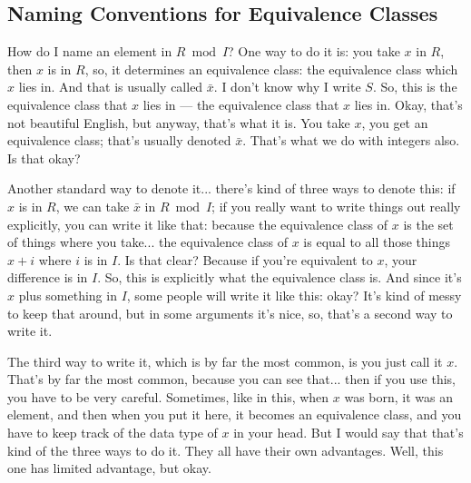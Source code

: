 \subsection{Naming Conventions for Equivalence Classes}

\begin{speech}[00:35:13 - 00:37:33]
How do I name an element in $R \bmod I$? One way to do it is: you take $x$ in $R$,  then $x$ is in $R$, so, it determines an equivalence class: the equivalence class which $x$ lies in. And that is usually called $\bar{x}$.  I don't know why I write $S$.  So, this is the equivalence class that $x$ lies in --- the equivalence class that $x$ lies in. Okay, that's not beautiful English, but anyway, that's what it is. You take $x$, you get an equivalence class; that's usually denoted $\bar{x}$. That's what we do with integers also. Is that okay? 

Another standard way to denote it... there's kind of three ways to denote this: if $x$ is in $R$, we can take $\bar{x}$ in $R \bmod I$;  if you really want to write things out really explicitly, you can write it like that:  because the equivalence class of $x$ is the set of things where you take... the equivalence class of $x$ is equal to all those things $x + i$ where $i$ is in $I$.  Is that clear? Because if you're equivalent to $x$, your difference is in $I$. So, this is explicitly what the equivalence class is. And since it's $x$ plus something in $I$, some people will write it like this:  okay? It's kind of messy to keep that around, but in some arguments it's nice, so, that's a second way to write it. 

The third way to write it, which is by far the most common, is you just call it $x$.  That's by far the most common, because you can see that... then if you use this, you have to be very careful. Sometimes, like in this, when $x$ was born, it was an element, and then when you put it here, it becomes an equivalence class, and you have to keep track of the data type of $x$ in your head. But I would say that that's kind of the three ways to do it. They all have their own advantages. Well, this one has limited advantage, but okay.
\end{speech}

